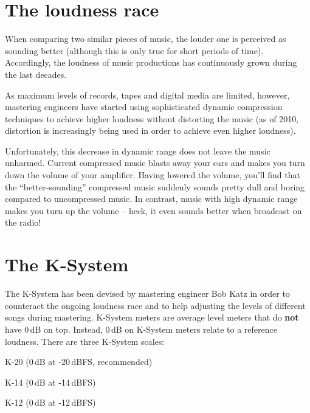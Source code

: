 \maketitle

\setcounter{tocdepth}{2}
\tableofcontents

\clearpage  %

\section{The loudness race}

When comparing two similar pieces of music, the louder one is
perceived as sounding better (although this is only true for short
periods of time).  Accordingly, the loudness of music productions has
continuously grown during the last decades.

As maximum levels of records, tapes and digital media are limited,
however, mastering engineers have started using sophisticated dynamic
compression techniques to achieve higher loudness without distorting
the music (as of 2010, distortion is increasingly being used in order
to achieve even higher loudness).

Unfortunately, this decrease in dynamic range does not leave the music
unharmed.  Current compressed music blasts away your ears and makes
you turn down the volume of your amplifier.  Having lowered the
volume, you'll find that the ``better-sounding'' compressed music
suddenly sounds pretty dull and boring compared to uncompressed music.
In contrast, music with high dynamic range makes you turn up the
volume -- heck, it even sounds better when broadcast on the radio!

\section{The K-System}

The K-System has been devised by mastering engineer Bob Katz in order
to counteract the ongoing loudness race and to help adjusting the
levels of different songs during mastering.  K-System meters are
average level meters that do \textbf{not} have 0\,dB on top.  Instead,
0\,dB on K-System meters relate to a reference loudness.  There are
three K-System scales:

\begin{compactitem}
\item K-20 (0\,dB at -20\,dBFS, recommended)
\item K-14 (0\,dB at -14\,dBFS)
\item K-12 (0\,dB at -12\,dBFS)
\end{compactitem}

